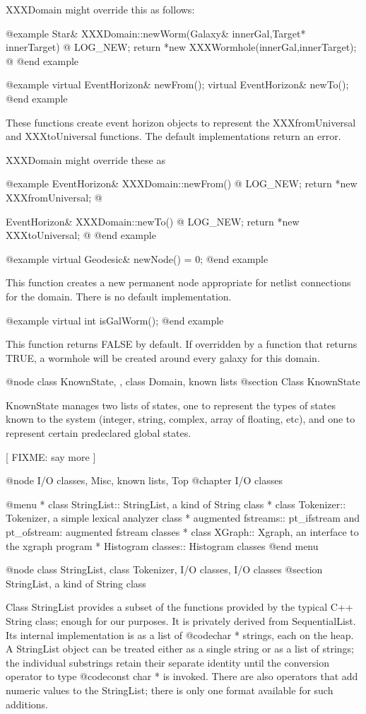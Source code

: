 XXXDomain might override this as follows:

@example
Star& XXXDomain::newWorm(Galaxy& innerGal,Target* innerTarget)  @{
        LOG_NEW; return *new XXXWormhole(innerGal,innerTarget);
@}
@end example

@example
virtual EventHorizon& newFrom();
virtual EventHorizon& newTo();
@end example

These functions create event horizon objects to represent the
XXXfromUniversal and XXXtoUniversal functions.  The default
implementations return an error.

XXXDomain might override these as

@example
EventHorizon& XXXDomain::newFrom() @{
    LOG_NEW; return *new XXXfromUniversal;
@}

EventHorizon& XXXDomain::newTo() @{
    LOG_NEW; return *new XXXtoUniversal;
@}
@end example

@example
virtual Geodesic& newNode() = 0;
@end example

This function creates a new permanent node appropriate for netlist
connections for the domain.  There is no default implementation.

@example
virtual int isGalWorm();
@end example

This function returns FALSE by default.  If overridden by a function
that returns TRUE, a wormhole will be created around every galaxy
for this domain.

@node class KnownState,  , class Domain, known lists
@section Class KnownState

KnownState manages two lists of states, one to represent the types of
states known to the system (integer, string, complex, array of floating,
etc), and one to represent certain predeclared global states.

[ FIXME: say more ]

@node I/O classes, Misc, known lists, Top
@chapter I/O classes

@menu
* class StringList::            StringList, a kind of String class
* class Tokenizer::             Tokenizer, a simple lexical analyzer class
* augmented fstreams::          pt_ifstream and pt_ofstream: augmented fstream classes
* class XGraph::                Xgraph, an interface to the xgraph program
* Histogram classes::           Histogram classes
@end menu

@node class StringList, class Tokenizer, I/O classes, I/O classes
@section StringList, a kind of String class

Class StringList provides a subset of the functions provided by the
typical C++ String class; enough for our purposes.  It is privately
derived from SequentialList.  Its internal implementation is as a
list of @code{char *} strings, each on the heap.  A StringList
object can be treated either as a single string or as a list of
strings; the individual substrings retain their separate identity
until the conversion operator to type @code{const char *} is invoked.
There are also operators that add numeric values to the StringList;
there is only one format available for such additions.

